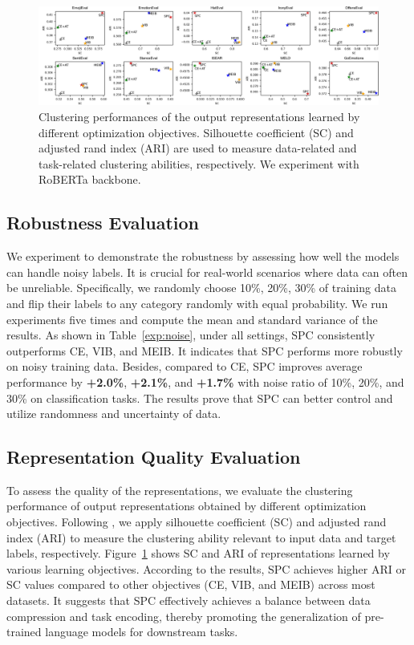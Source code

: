 \documentclass[letterpaper]{article} %
\begin{document}
\begin{figure}[t]
\centering
\includegraphics[width=0.95\linewidth]{figures/struc_eval.png}
\caption{Clustering performances of the output representations learned by different optimization objectives. Silhouette coefficient (SC) and adjusted rand index (ARI) are used to measure data-related and task-related clustering abilities, respectively.
We experiment with RoBERTa backbone.}
\label{fig:struct}
\end{figure}

\subsection{Robustness Evaluation}
We experiment to demonstrate the robustness by assessing how well the models can handle noisy labels.
It is crucial for real-world scenarios where data can often be unreliable.
Specifically, we randomly choose 10\%, 20\%, 30\% of training data and flip their labels to any category randomly with equal probability.
We run experiments five times and compute the mean and standard variance of the results. As shown in Table~\ref{exp:noise},
under all settings, SPC consistently outperforms CE, VIB, and MEIB.
It indicates that SPC performs more robustly on noisy training data.
Besides, compared to CE, SPC improves average performance by \textbf{+2.0\%}, \textbf{+2.1\%}, and \textbf{+1.7\%}  with noise ratio of 10\%, 20\%, and 30\% on classification tasks.
The results prove that SPC can better control and utilize randomness and uncertainty of data.



\subsection{Representation Quality Evaluation}
To assess the quality of the representations, we evaluate the clustering performance of output representations obtained by different optimization objectives.
Following \citet{DBLP:conf/acl/0001BWZH23}, we apply silhouette coefficient (SC) and adjusted rand index (ARI) to measure the clustering ability relevant to input data and target labels, respectively.
Figure~\ref{fig:struct} shows SC and ARI of representations learned by various learning objectives.
According to the results, SPC achieves higher ARI or SC values compared to other objectives (CE, VIB, and MEIB) across most datasets.
It suggests that SPC effectively achieves a balance between data compression and task encoding, thereby promoting the generalization of pre-trained language models for downstream tasks.
\end{document}
